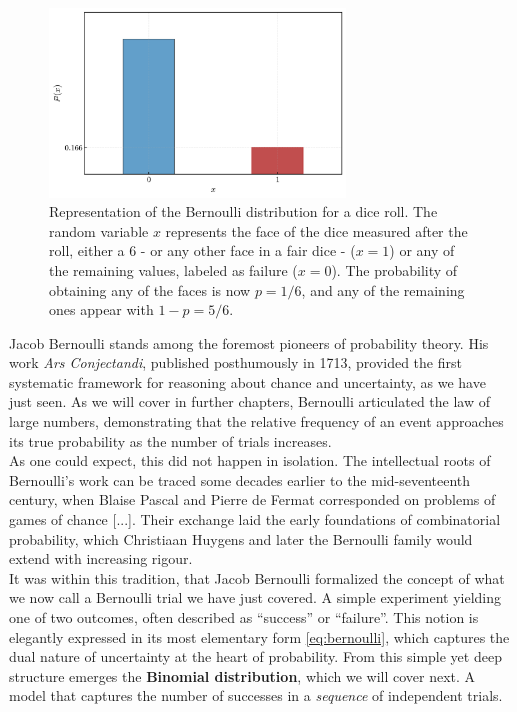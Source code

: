 \documentclass{book}
\begin{document}
\begin{figure}[ht]
    \centering
    \includegraphics[width=0.7\textwidth]{figures/chapter2/bernoulli_2.png}
    \caption{Representation of the Bernoulli distribution for a dice roll. The random variable $x$ represents the face of the dice measured after the roll, either a 6 - or any other face in a fair dice - ($x = 1$) or any of the remaining values, labeled as failure ($x = 0$). The probability of obtaining any of the faces is now $p = 1/6$, and any of the remaining ones appear with $1 - p = 5/6$.}
    \label{fig:bernoulli_2}
\end{figure}

Jacob Bernoulli stands among the foremost pioneers of probability theory. His work \textit{Ars Conjectandi}, published posthumously in 1713, provided the first systematic framework for reasoning about chance and uncertainty, as we have just seen. As we will cover in further chapters, Bernoulli articulated the law of large numbers, demonstrating that the relative frequency of an event approaches its true probability as the number of trials increases.\\

As one could expect, this did not happen in isolation. The intellectual roots of Bernoulli’s work can be traced some decades earlier to the mid-seventeenth century, when Blaise Pascal and Pierre de Fermat corresponded on problems of games of chance [...]. Their exchange laid the early foundations of combinatorial probability, which Christiaan Huygens and later the Bernoulli family would extend with increasing rigour.\\

It was within this tradition, that Jacob Bernoulli formalized the concept of what we now call a Bernoulli trial we have just covered. A simple experiment yielding one of two outcomes, often described as “success” or “failure”. This notion is elegantly expressed in its most elementary form \eqref{eq:bernoulli}, which captures the dual nature of uncertainty at the heart of probability. From this simple yet deep structure emerges the \textbf{Binomial distribution}, which we will cover next. A model that captures the number of successes in a \textit{sequence} of independent trials.
\end{document}
